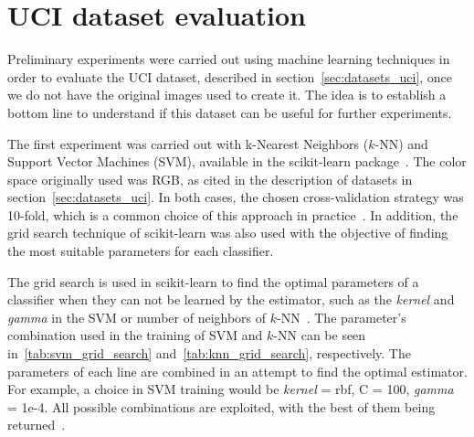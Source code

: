 \section{UCI dataset evaluation}
\label{sec:ml_experiments}
Preliminary experiments were carried out using machine learning techniques in order to evaluate the UCI dataset, described in section~\ref{sec:datasets_uci}, once we do not have the original images used to create it. The idea is to establish a bottom line to understand if this dataset can be useful for further experiments.

The first experiment was carried out with k-Nearest Neighbors ($k$-NN) and Support Vector Machines (SVM), available in the scikit-learn package~\citep{scikit-learn:11}. The color space originally used was RGB, as cited in the description of datasets in section~\ref{sec:datasets_uci}. In both cases, the chosen cross-validation strategy was 10-fold, which is a common choice of this approach in practice~\citep{mostafa:12}. In addition, the grid search technique of scikit-learn was also used with the objective of finding the most suitable parameters for each classifier.

The grid search is used in scikit-learn to find the optimal parameters of a classifier when they can not be learned by the estimator, such as the \emph{kernel} and \emph{gamma} in the SVM or number of neighbors of $k$-NN~\citep{scikit-learn:11}. The parameter's combination used in the training of SVM and $k$-NN can be seen in~\ref{tab:svm_grid_search} and~\ref{tab:knn_grid_search}, respectively. The parameters of each line are combined in an attempt to find the optimal estimator. For example, a choice in SVM training would be \emph{kernel} = rbf, C = 100, \emph{gamma} = 1e-4. All possible combinations are exploited, with the best of them being returned~\citep{scikit-learn:11}.

